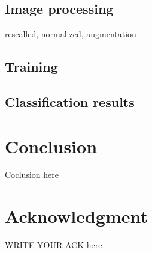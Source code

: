 \documentclass[journal,onecolumn,12pt]{IEEEtran}
\begin{document}
\subsection{Image processing}
rescalled, normalized, augmentation

\subsection{Training}

\subsection{Classification results}

\section{Conclusion}
Coclusion here

\section*{Acknowledgment}
WRITE YOUR ACK here

\end{document}
